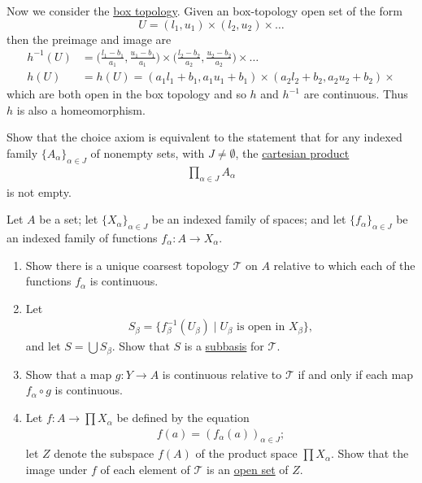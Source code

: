 \begin{solution}
    Now we consider the \hyperref[def:box-topology]{box topology}. Given an box-topology open set of the form 
    \begin{equation}
      U = (l_1, u_1) \times (l_2, u_2) \times \ldots
    \end{equation} 
    then the preimage and image are 
    \begin{align}
      h^{-1} (U) & = \bigg( \frac{l_1 - b_1}{a_1}, \frac{u_1 - b_1}{a_1} \bigg) \times \bigg( \frac{l_2 - b_2}{a_2}, \frac{u_2 - b_2}{a_2} \bigg) \times \ldots \\
      h(U) & = h(U) = (a_1 l_1 + b_1, a_1 u_1 + b_1) \times (a_2 l_2 + b_2, a_2 u_2 + b_2) \times 
    \end{align}
    which are both open in the box topology and so $h$ and $h^{-1}$ are continuous. Thus $h$ is also a homeomorphism. 
  \end{solution}

  \begin{exercise}[Munkres 19.9]
    Show that the choice axiom is equivalent to the statement that for any indexed family $\{A_\alpha\}_{\alpha \in J}$ of nonempty sets, with $J \neq \emptyset$, the \hyperref[st-def:cart-prod-2]{cartesian product}
    \begin{align*}
      \prod_{\alpha \in J} A_\alpha
    \end{align*}
    is not empty.
  \end{exercise}

  \begin{exercise}[Munkres 19.10]
    Let $A$ be a set; let $\{X_\alpha\}_{\alpha \in J}$ be an indexed family of spaces; and let $\{f_\alpha\}_{\alpha \in J}$ be an indexed family of functions $f_\alpha : A \to X_\alpha$.
    \begin{enumerate}
      \item Show there is a unique coarsest topology $\mathcal{T}$ on $A$ relative to which each of the functions $f_\alpha$ is continuous.
      \item Let
      \begin{align*}
        S_\beta = \{f_\beta^{-1}(U_\beta) \mid U_\beta \text{ is open in } X_\beta\},
      \end{align*}
      and let $S = \bigcup S_\beta$. Show that $S$ is a \hyperref[def:subbasis]{subbasis} for $\mathcal{T}$.
      \item Show that a map $g : Y \to A$ is continuous relative to $\mathcal{T}$ if and only if each map $f_\alpha \circ g$ is continuous.
      \item Let $f : A \to \prod X_\alpha$ be defined by the equation
      \begin{align*}
        f(a) = (f_\alpha(a))_{\alpha \in J};
      \end{align*}
      let $Z$ denote the subspace $f(A)$ of the product space $\prod X_\alpha$. Show that the image under $f$ of each element of $\mathcal{T}$ is an \hyperref[def:open-set]{open set} of $Z$.
    \end{enumerate}
  \end{exercise}

